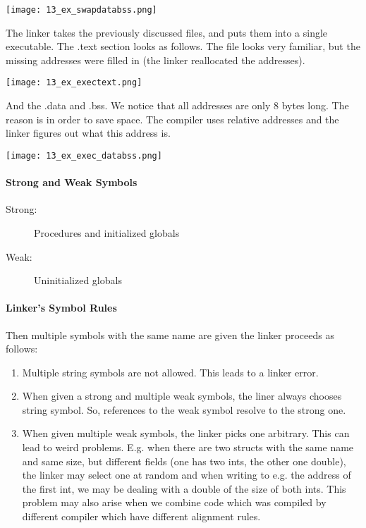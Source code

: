 \texttt{[image: 13\_ex\_swapdatabss.png]}

The linker takes the previously discussed files, and puts them into a single executable. The .text section looks as follows. The file looks very familiar, but the missing addresses were filled in (the linker reallocated the addresses). 

\texttt{[image: 13\_ex\_exectext.png]}

And the .data and .bss. We notice that all addresses are only $8$ bytes long. The reason is in order to save space. The compiler uses relative addresses and the linker figures out what this address is.

\texttt{[image: 13\_ex\_exec\_databss.png]}

\paragraph{Strong and Weak Symbols}
\begin{description}
    \item[Strong:] Procedures and initialized globals
    \item[Weak:] Uninitialized globals
\end{description}

\paragraph{Linker's Symbol Rules}
Then multiple symbols with the same name are given the linker proceeds as follows:

\begin{enumerate}
    \item Multiple string symbols are not allowed. This leads to a linker error.
    \item When given a strong and multiple weak symbols, the liner always chooses string symbol. So, references to the weak symbol resolve to the strong one.
    \item When given multiple weak symbols, the linker picks one arbitrary. This can lead to weird problems. E.g. when there are two structs with the same name and same size, but different fields (one has two ints, the other one double), the linker may select one at random and when writing to e.g. the address of the first int, we may be dealing with a double of the size of both ints. This problem may also arise when we combine code which was compiled by different compiler which have different alignment rules.
\end{enumerate}

